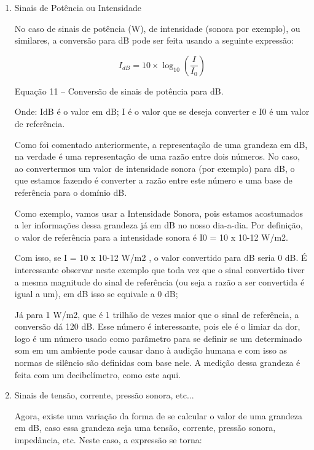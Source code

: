 \begin{enumerate}
     \item Sinais de Potência ou Intensidade
     
     No caso de sinais de potência (W), de intensidade (sonora por exemplo), ou similares, a conversão para dB pode ser feita usando a seguinte expressão:
     
     $$
     I_{dB} = 10 \times \log_{10}\left ( \frac{I}{I_{0}} \right )
     $$
     
    \begin{center}
        Equação 11 – Conversão de sinais de potência para dB. 
    \end{center}
    
    Onde: IdB é o valor em dB; I é o valor que se deseja converter e I0 é um valor de referência.

    Como foi comentado anteriormente, a representação de uma grandeza em dB, na verdade é uma representação de uma razão entre dois números. No caso, ao convertermos um valor de intensidade sonora (por exemplo) para dB, o que estamos fazendo é converter a razão entre este número e uma base de referência para o domínio dB.

    Como exemplo, vamos usar a Intensidade Sonora, pois estamos acostumados a ler informações dessa grandeza já em dB no nosso dia-a-dia. Por definição, o valor de referência para a intensidade sonora é I0 = 10 x 10-12 W/m2.

    Com isso, se I = 10 x 10-12 W/m2 , o valor convertido para dB seria 0 dB. É interessante observar neste exemplo que toda vez que o sinal convertido tiver a mesma magnitude do sinal de referência (ou seja a razão a ser convertida é igual a um), em dB isso se equivale a 0 dB;

    Já para 1 W/m2, que é 1 trilhão de vezes maior que o sinal de referência, a conversão dá 120 dB. Esse número é interessante, pois ele é o limiar da dor, logo é um número usado como parâmetro para se definir se um determinado som em um ambiente pode causar dano à audição humana e com isso as normas de silêncio são definidas com base nele. A medição dessa grandeza é feita com um decibelímetro, como este aqui.
    
    \item Sinais de tensão, corrente, pressão sonora, etc...
    
    Agora, existe uma variação da forma de se calcular o valor de uma grandeza em dB, caso essa grandeza seja uma tensão, corrente, pressão sonora, impedância, etc. Neste caso, a expressão se torna:
    

\end{enumerate}
